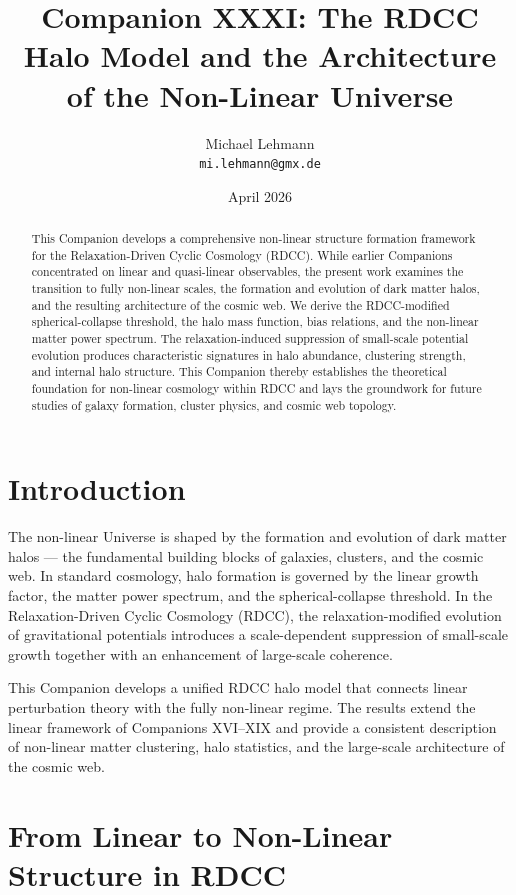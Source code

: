 \documentclass[11pt,a4paper]{article}
\title{\textbf{Companion XXXI: The RDCC Halo Model and the Architecture of the Non-Linear Universe}}
\author{Michael Lehmann \\ \texttt{mi.lehmann@gmx.de}}
\date{April 2026}
\begin{document}
\maketitle

\begin{abstract}
This Companion develops a comprehensive non-linear structure formation framework for the Relaxation-Driven Cyclic Cosmology (RDCC). While earlier Companions concentrated on linear and quasi-linear observables, the present work examines the transition to fully non-linear scales, the formation and evolution of dark matter halos, and the resulting architecture of the cosmic web. We derive the RDCC-modified spherical-collapse threshold, the halo mass function, bias relations, and the non-linear matter power spectrum. The relaxation-induced suppression of small-scale potential evolution produces characteristic signatures in halo abundance, clustering strength, and internal halo structure. This Companion thereby establishes the theoretical foundation for non-linear cosmology within RDCC and lays the groundwork for future studies of galaxy formation, cluster physics, and cosmic web topology.
\end{abstract}

\section{Introduction}

The non-linear Universe is shaped by the formation and evolution of dark matter halos — the fundamental building blocks of galaxies, clusters, and the cosmic web. In standard cosmology, halo formation is governed by the linear growth factor, the matter power spectrum, and the spherical-collapse threshold. In the Relaxation-Driven Cyclic Cosmology (RDCC), the relaxation-modified evolution of gravitational potentials introduces a scale-dependent suppression of small-scale growth together with an enhancement of large-scale coherence.

This Companion develops a unified RDCC halo model that connects linear perturbation theory with the fully non-linear regime. The results extend the linear framework of Companions XVI–XIX and provide a consistent description of non-linear matter clustering, halo statistics, and the large-scale architecture of the cosmic web.

\section{From Linear to Non-Linear Structure in RDCC}
\end{document}
